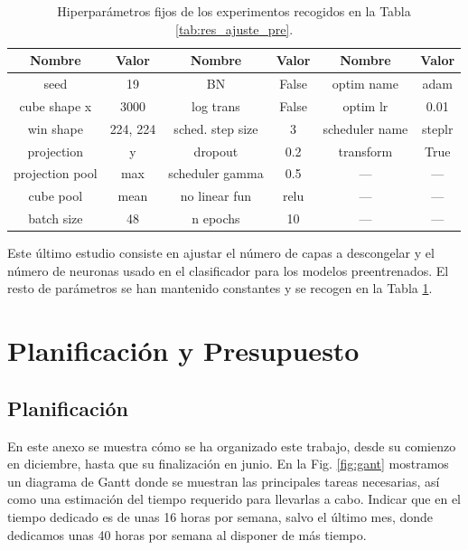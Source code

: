 \documentclass[a4paper,12pt,oneside,titlepage]{book}
\begin{document}
\begin{appendices}
  \begin{table}[h!]
    \centering
    \begin{tabular}{|c|c||c|c||c|c|}
    \hline
    Nombre          & Valor    & Nombre           & Valor & Nombre         & Valor  \\ \hline\hline
    seed            & 19       & BN               & False & optim name     & adam   \\ \hline
    cube shape x    & 3000     & log trans        & False & optim lr       & 0.01   \\ \hline
    win shape       & 224, 224 & sched. step size & 3     & scheduler name & steplr \\ \hline
    projection      & y        & dropout          & 0.2   & transform      & True   \\ \hline
    projection pool & max      & scheduler gamma  & 0.5   & ---            & ---     \\ \hline
    cube pool       & mean     & no linear fun    & relu  & ---            & ---    \\ \hline
    batch size      & 48       & n epochs         & 10    & ---            & ---    \\ \hline
    \end{tabular}
    \caption{Hiperparámetros fijos de los experimentos recogidos en la Tabla \ref{tab:res_ajuste_pre}.}
    \label{tab:anexo_pre}
  \end{table}
  Este último estudio consiste en ajustar el número de capas a descongelar y el número de neuronas usado en el clasificador para los modelos preentrenados. El resto de parámetros se han mantenido constantes y se recogen en la Tabla \ref{tab:anexo_pre}.

  \chapter{Planificación y Presupuesto}
  \label{an:pres}
  \section{Planificación}
  En este anexo se muestra cómo se ha organizado este trabajo, desde su comienzo en diciembre, hasta que su finalización en junio. En la Fig. \ref{fig:gant} mostramos un diagrama de Gantt donde se muestran las principales tareas necesarias, así como una estimación del tiempo requerido para llevarlas a cabo. Indicar que en el tiempo dedicado es de unas 16 horas por semana, salvo el último mes, donde dedicamos unas 40 horas por semana al disponer de más tiempo.


\end{appendices}
\end{document}
